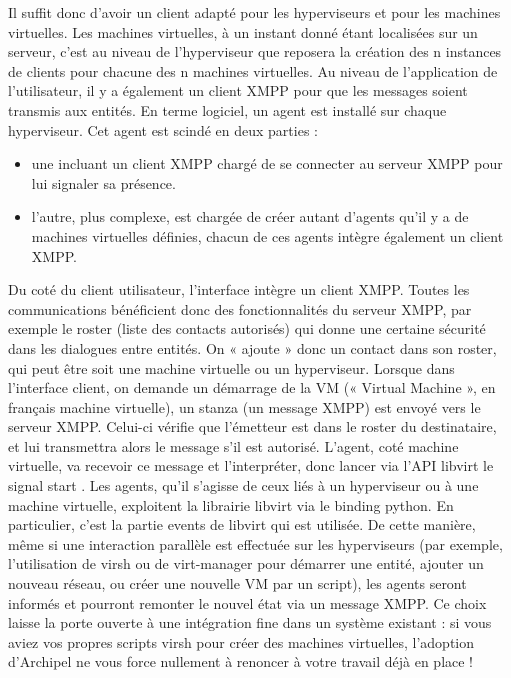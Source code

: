 Il suffit donc d'avoir un client adapté pour les hyperviseurs et pour les machines virtuelles. Les machines
virtuelles, à un instant donné étant localisées sur un serveur, c'est au niveau de l'hyperviseur que
reposera la création des n instances de clients pour chacune des n machines virtuelles. Au niveau de
l'application de l'utilisateur, il y a également un client XMPP pour que les messages soient transmis aux
entités.\newline
En terme logiciel, un agent est installé sur chaque hyperviseur. Cet agent est scindé en deux parties :\newline
\begin{itemize}
 \item une incluant un client XMPP chargé de se connecter au serveur XMPP pour lui signaler sa présence.
 \item l'autre, plus complexe, est chargée de créer autant d'agents qu'il y a de machines
 virtuelles définies, chacun de ces agents intègre également un client XMPP.\newline
\end{itemize}

Du coté du client utilisateur, l'interface intègre un client XMPP. Toutes les communications bénéficient
donc des fonctionnalités du serveur XMPP, par exemple le roster (liste des contacts autorisés) qui donne
une certaine sécurité dans les dialogues entre entités. On « ajoute » donc un contact dans son roster, qui
peut être soit une machine virtuelle ou un hyperviseur. Lorsque dans l'interface client, on demande un
démarrage de la VM (« Virtual Machine », en français machine virtuelle), un stanza (un message XMPP)
est envoyé vers le serveur XMPP. Celui-ci vérifie que l’émetteur est dans le roster du destinataire, et lui
transmettra alors le message s'il est autorisé. L'agent, coté machine virtuelle, va recevoir ce message et
l'interpréter, donc lancer via l'API libvirt le signal start .\newline
Les agents, qu'il s'agisse de ceux liés à un hyperviseur ou à une machine virtuelle, exploitent la librairie
libvirt via le binding python. En particulier, c'est la partie events de libvirt qui est utilisée. De cette
manière, même si une interaction parallèle est effectuée sur les hyperviseurs (par exemple, l'utilisation de
virsh ou de virt-manager pour démarrer une entité, ajouter un nouveau réseau, ou créer une nouvelle VM
par un script), les agents seront informés et pourront remonter le nouvel état via un message XMPP.
Ce choix laisse la porte ouverte à une intégration fine dans un système existant : si vous aviez vos
propres scripts virsh pour créer des machines virtuelles, l'adoption d'Archipel ne vous force nullement à
renoncer à votre travail déjà en place !

